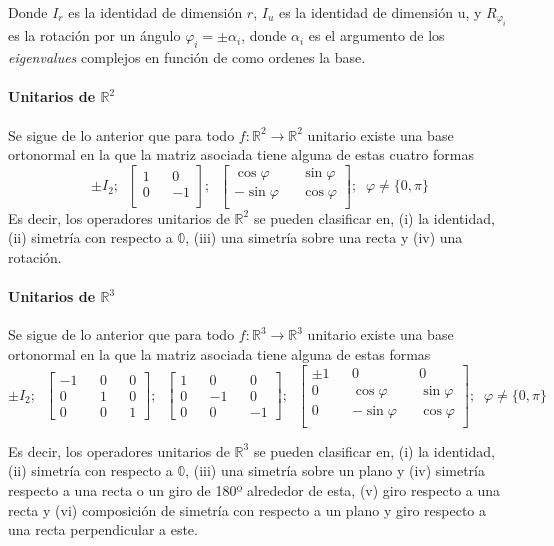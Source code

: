 \documentclass{preset}
\begin{document}
Donde $I_r$ es la identidad de dimensión $r$, $I_u$ es la identidad de dimensión u, y $R_{\varphi_i}$ es la rotación por un ángulo $\varphi_i=\pm \alpha_i$, donde $\alpha_i$ es el argumento de los \textit{eigenvalues} complejos en función de como ordenes la base.

\vspace{-5pt}
\paragraph{Unitarios de $\mathbb{R}^2$}

Se sigue de lo anterior que para todo $f: \mathbb{R}^2 \rightarrow \mathbb{R}^2$ unitario existe una base ortonormal en la que la matriz asociada tiene alguna de estas cuatro formas
\vspace{-7pt}
\[\pm I_2; \;\; \left[\begin{matrix}
1 && 0  \\
0 && -1\\
\end{matrix}\right]; \;\;
\left[\begin{matrix}
\cos{\varphi} && \sin{\varphi}  \\
-\sin{\varphi} && \cos{\varphi}\\
\end{matrix}\right]; \;\; \varphi \neq \{0,\pi\}\]
Es decir, los operadores unitarios de $\mathbb{R}^2$ se pueden clasificar en, (i) la identidad, (ii) simetría con respecto a $\mathbb{0}$, (iii) una simetría sobre una recta y (iv) una rotación.

\vspace{-5pt}
\paragraph{Unitarios de $\mathbb{R}^3$}

Se sigue de lo anterior que para todo $f: \mathbb{R}^3 \rightarrow \mathbb{R}^3$ unitario existe una base ortonormal en la que la matriz asociada tiene alguna de estas formas
\[\pm I_2; \;\;\left[\begin{matrix}
-1 && 0  && 0\\
0 && 1 && 0\\
0 && 0 && 1
\end{matrix}\right]; \;\;
\left[\begin{matrix}
1 && 0  && 0\\
0 && -1 && 0\\
0 && 0 && -1
\end{matrix}\right]; \;\;
\left[\begin{matrix}
\pm 1 && 0&& 0\\
0&&\cos{\varphi} && \sin{\varphi}  \\
0&&-\sin{\varphi} && \cos{\varphi}\\
\end{matrix}\right]; \;\;\varphi \neq \{0,\pi\}\]

Es decir, los operadores unitarios de $\mathbb{R}^3$ se pueden clasificar en, (i) la identidad, (ii) simetría con respecto a $\mathbb{0}$, (iii) una simetría sobre un plano y (iv) simetría respecto a una recta o un giro de 180º alrededor de esta, (v) giro respecto a una recta y (vi) composición de simetría con respecto a un plano y giro respecto a una recta perpendicular a este.
\end{document}
